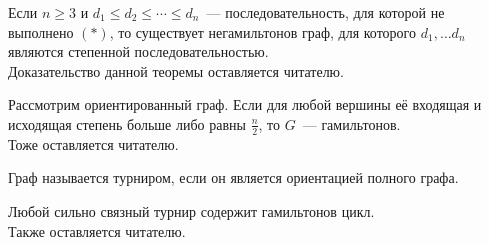 \documentclass{article}
\begin{document}
    \begin{theorem}
        Если $n\geqslant 3$ и $d_1\leqslant d_2\leqslant\cdots\leqslant d_n$~--- последовательность, для которой не выполнено $(*)$, то существует негамильтонов граф, для которого $d_1,\ldots d_n$ являются степенной последовательностью.\\
        Доказательство данной теоремы оставляется читателю.
    \end{theorem}
    \begin{theorem}
        Рассмотрим ориентированный граф. Если для любой вершины её входящая и исходящая степень больше либо равны $\frac n2$, то $G$~--- гамильтонов.\\
        Тоже оставляется читателю.
    \end{theorem}
    \begin{definition}
        Граф называется турниром, если он является ориентацией полного графа.
    \end{definition}
    \begin{theorem}
        Любой сильно связный турнир содержит гамильтонов цикл.\\
        Также оставляется читателю.
    \end{theorem}
\end{document}
